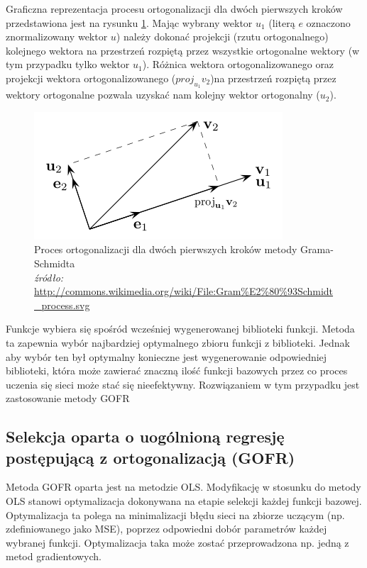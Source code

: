 Graficzna reprezentacja procesu ortogonalizacji dla dwóch pierwszych kroków przedstawiona jest na rysunku \ref{fig:gram}. Mając wybrany wektor $u_1$ (literą $e$ oznaczono znormalizowany wektor $u$) należy dokonać projekcji (rzutu ortogonalnego) kolejnego wektora na przestrzeń rozpiętą przez wszystkie ortogonalne wektory (w tym przypadku tylko wektor $u_1$). Różnica wektora ortogonalizowanego oraz projekcji wektora ortogonalizowanego ($proj_{u_1}v_2$)na przestrzeń rozpiętą przez wektory ortogonalne pozwala uzyskać nam kolejny wektor ortogonalny ($u_2$).
\begin{figure}[ht!]
	\centering
	
	\includegraphics[scale=0.7]{images/GramSchmidt.png}
	\caption{Proces ortogonalizacji dla dwóch pierwszych kroków metody Grama-Schmidta \\
	\footnotesize {\textit{źródło:} \url{http://commons.wikimedia.org/wiki/File:Gram\%E2\%80\%93Schmidt\_process.svg}}}
	\label{fig:gram}	

\end{figure}

Funkcje wybiera się spośród wcześniej wygenerowanej biblioteki funkcji. Metoda ta zapewnia wybór najbardziej optymalnego zbioru funkcji z biblioteki. Jednak aby wybór ten był optymalny konieczne jest wygenerowanie odpowiedniej biblioteki, która może zawierać znaczną ilość funkcji bazowych przez co proces uczenia się sieci może stać się nieefektywny. Rozwiązaniem w tym przypadku jest zastosowanie metody GOFR

\subsection{Selekcja oparta o uogólnioną regresję postępującą z ortogonalizacją (GOFR)}
Metoda GOFR oparta jest na metodzie OLS\cite{Duboisa}. Modyfikację w stosunku do metody OLS stanowi optymalizacja dokonywana na etapie selekcji każdej funkcji bazowej. Optymalizacja ta polega na minimalizacji błędu sieci na zbiorze uczącym (np. zdefiniowanego jako MSE), poprzez odpowiedni dobór parametrów każdej wybranej funkcji. Optymalizacja taka może zostać przeprowadzona np. jedną z metod gradientowych.

